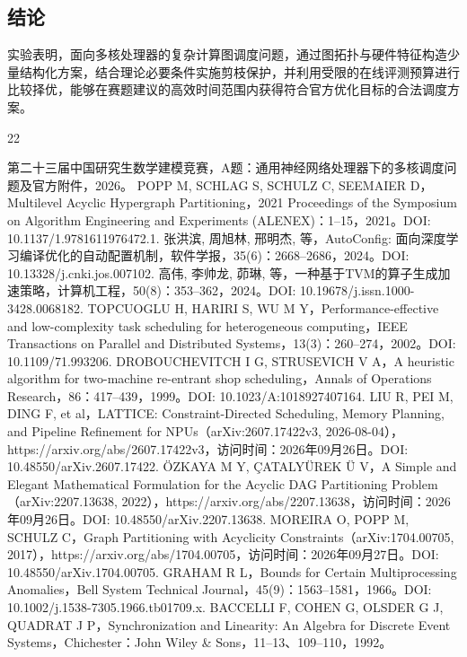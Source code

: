 \documentclass[anonymous,withtoc]{gmcm2026}
\begin{document}
\subsection{结论}

实验表明，面向多核处理器的复杂计算图调度问题，通过图拓扑与硬件特征构造少量结构化方案，结合理论必要条件实施剪枝保护，并利用受限的在线评测预算进行比较择优，能够在赛题建议的高效时间范围内获得符合官方优化目标的合法调度方案。


\FloatBarrier
{}\begin{thebibliography}{22}
\raggedright
{} 第二十三届中国研究生数学建模竞赛，A题：通用神经网络处理器下的多核调度问题及官方附件，2026。
 POPP M, SCHLAG S, SCHULZ C, SEEMAIER D，Multilevel Acyclic Hypergraph Partitioning，2021 Proceedings of the Symposium on Algorithm Engineering and Experiments (ALENEX)：1--15，2021。DOI: 10.1137/1.9781611976472.1.
 张洪滨, 周旭林, 邢明杰, 等，AutoConfig: 面向深度学习编译优化的自动配置机制，软件学报，35(6)：2668--2686，2024。DOI: 10.13328/j.cnki.jos.007102.
 高伟, 李帅龙, 茆琳, 等，一种基于TVM的算子生成加速策略，计算机工程，50(8)：353--362，2024。DOI: 10.19678/j.issn.1000-3428.0068182.
 TOPCUOGLU H, HARIRI S, WU M Y，Performance-effective and low-complexity task scheduling for heterogeneous computing，IEEE Transactions on Parallel and Distributed Systems，13(3)：260--274，2002。DOI: 10.1109/71.993206.
 DROBOUCHEVITCH I G, STRUSEVICH V A，A heuristic algorithm for two-machine re-entrant shop scheduling，Annals of Operations Research，86：417--439，1999。DOI: 10.1023/A:1018927407164.
 LIU R, PEI M, DING F, et al，LATTICE: Constraint-Directed Scheduling, Memory Planning, and Pipeline Refinement for NPUs（arXiv:2607.17422v3, 2026-08-04），https://arxiv.org/abs/2607.17422v3，访问时间：2026年09月26日。DOI: 10.48550/arXiv.2607.17422.
 ÖZKAYA M Y, ÇATALYÜREK Ü V，A Simple and Elegant Mathematical Formulation for the Acyclic DAG Partitioning Problem（arXiv:2207.13638, 2022），https://arxiv.org/abs/2207.13638，访问时间：2026年09月26日。DOI: 10.48550/arXiv.2207.13638.
 MOREIRA O, POPP M, SCHULZ C，Graph Partitioning with Acyclicity Constraints（arXiv:1704.00705, 2017），https://arxiv.org/abs/1704.00705，访问时间：2026年09月27日。DOI: 10.48550/arXiv.1704.00705.
 GRAHAM R L，Bounds for Certain Multiprocessing Anomalies，Bell System Technical Journal，45(9)：1563--1581，1966。DOI: 10.1002/j.1538-7305.1966.tb01709.x.
 BACCELLI F, COHEN G, OLSDER G J, QUADRAT J P，Synchronization and Linearity: An Algebra for Discrete Event Systems，Chichester：John Wiley \& Sons，11--13、109--110，1992。

\end{thebibliography}
\end{document}
